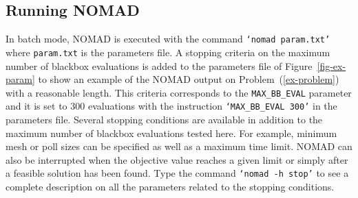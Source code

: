 \documentclass[12pt,english]{article}
\newcommand{\nomad}{NOMAD\xspace}
\newcommand{\bb}{blackbox\xspace}
\begin{document}
\subsection*{Running \nomad}

In batch mode, \nomad is executed with the command
  \texttt{`nomad param.txt'} where \texttt{param.txt} is the parameters file.
A stopping criteria on the maximum number of \bb evaluations is added
  to the parameters file of Figure~\ref{fig-ex-param} to show
  an example of the \nomad output on Problem~(\ref{ex-problem})
  with a reasonable length.
This criteria corresponds to the
   \texttt{MAX\_BB\_EVAL} parameter and it is set to 300
   evaluations with the instruction
   \texttt{`MAX\_BB\_EVAL 300'} in the parameters file.
Several stopping conditions are available in addition to the maximum number
           of \bb evaluations tested here.
 For example, minimum mesh or poll sizes can be specified
          as well as a maximum time limit. \nomad can also be interrupted when
          the objective value reaches a given limit or simply
          after a feasible solution has been found.
 Type the command \texttt{`nomad -h stop'} to
           see a complete description on all the parameters related
           to the stopping conditions.
\end{document}
